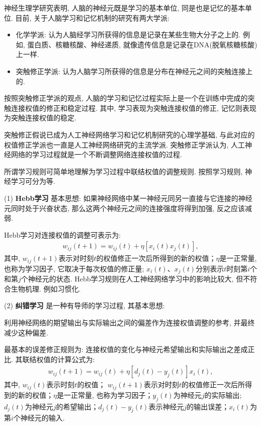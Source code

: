 神经生理学研究表明, 人脑的神经元既是学习的基本单位, 同是也是记忆的基本单位. 目前, 关于人脑学习和记忆机制的研究有两大学派:
\begin{itemize}
\item 化学学派: 认为人脑经学习所获得的信息是记录在某些生物大分子之上的. 例如, 蛋白质、核糖核酸、神经递质, 就像遗传信息是记录在DNA(脱氧核糖核酸)上一样.
\item 突触修正学派: 认为人脑学习所获得的信息是分布在神经元之间的突触连接上的.
\end{itemize}
按照突触修正学派的观点, 人脑的学习和记忆过程实际上是一个在训练中完成的突触连接权值的修正和稳定过程. 其中, 学习表现为突触连接权值的修正, 记忆则表现为突触连接权值的稳定.

突触修正假说已成为人工神经网络学习和记忆机制研究的心理学基础, 与此对应的权值修正学派也一直是人工神经网络研究的主流学派.
突触修正学派认为, 人工神经网络的学习过程就是一个不断调整网络连接权值的过程.

所谓学习规则可简单地理解为学习过程中联结权值的调整规则. 按照学习规则, 神经学习可分为等.

    (1) \textbf{Hebb学习} 基本思想: 如果神经网络中某一神经元同另一直接与它连接的神经元同时处于兴奋状态, 那么这两个神经元之间的连接强度将得到加强, 反之应该减弱.

Hebb学习对连接权值的调整可表示为:
\begin{align}
  w_{i j}(t+1)=w_{i j}(t)+\eta\left[x_{i}(t) x_{j}(t)\right],
\end{align}
其中, $w_{ij}(t+1)$表示对时刻$t$的权值修正一次后所得到的新的权值；$\eta$是一正常量, 也称为学习因子, 它取决于每次权值的修正量;
$x_i(t)$、$x_j(t)$分别表示$t$时刻第$i$个和第$j$个神经元的状态.
Hebb学习规则在人工神经网络学习中的影响比较大, 但不符合生物机理. 例如习惯化.

  (2) \textbf{纠错学习} 是一种有导师的学习过程, 其基本思想:

利用神经网络的期望输出与实际输出之间的偏差作为连接权值调整的参考, 并最终减少这种偏差.

最基本的误差修正规则为: 连接权值的变化与神经元希望输出和实际输出之差成正比. 其联结权值的计算公式为:
\begin{align}
  w_{i j}(t+1)=w_{i j}(t)+\eta\left[d_{j}(t)-y_{j}(t)\right] x_{i}(t),
\end{align}
其中,  $w_{ij}(t)$表示时刻$t$的权值； $w_{ij}(t+1)$表示对时刻$t$的权值修正一次后所得到的新的权值；$\eta$是一正常量, 也称为学习因子；$y_j(t)$为神经元$j$的实际输出; $d_j(t)$为神经元$j$的希望输出；$d_j(t)-y_j(t)$表示神经元$j$的输出误差；$x_i(t)$为第$i$个神经元的输入.

